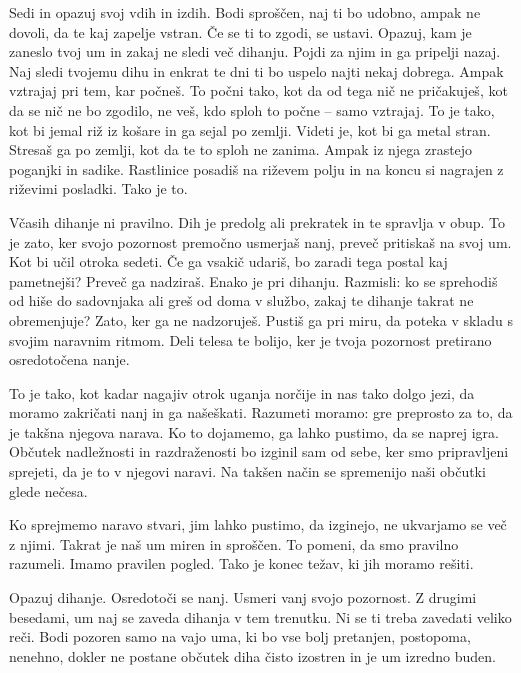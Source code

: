 Sedi in opazuj svoj vdih in izdih. Bodi sproščen, naj ti bo udobno, ampak ne dovoli, da te kaj zapelje vstran. Če se ti to zgodi, se ustavi. Opazuj, kam je zaneslo tvoj um in zakaj ne sledi več dihanju. Pojdi za njim in ga pripelji nazaj. Naj sledi tvojemu dihu in enkrat te dni ti bo uspelo najti nekaj dobrega. Ampak vztrajaj pri tem, kar počneš. To počni tako, kot da od tega nič ne pričakuješ, kot da se nič ne bo zgodilo, ne veš, kdo sploh to počne – samo vztrajaj. To je tako, kot bi jemal riž iz košare in ga sejal po zemlji. Videti je, kot bi ga metal stran. Stresaš ga po zemlji, kot da te to sploh ne zanima. Ampak iz njega zrastejo poganjki in sadike. Rastlinice posadiš na riževem polju in na koncu si nagrajen z riževimi posladki. Tako je to.

\clearpage

\enlargethispage{2\baselineskip}


Včasih dihanje ni pravilno. Dih je predolg ali prekratek in te spravlja v obup. To je zato, ker svojo pozornost premočno usmerjaš nanj, preveč pritiskaš na svoj um. Kot bi učil otroka sedeti. Če ga vsakič udariš, bo zaradi tega postal kaj pametnejši? Preveč ga nadziraš. Enako je pri dihanju. Razmisli: ko se sprehodiš od hiše do sadovnjaka ali greš od doma v službo, zakaj te dihanje takrat ne obremenjuje? Zato, ker ga ne nadzoruješ. Pustiš ga pri miru, da poteka v skladu s svojim naravnim ritmom. Deli telesa te bolijo, ker je tvoja pozornost pretirano osredotočena nanje.

\vspace{-2\baselineskip}

To je tako, kot kadar nagajiv otrok uganja norčije in nas tako dolgo jezi, da moramo zakričati nanj in ga našeškati. Razumeti moramo: gre preprosto za to, da je takšna njegova narava. Ko to dojamemo, ga lahko pustimo, da se naprej igra. Občutek nadležnosti in razdraženosti bo izginil sam od sebe, ker smo pripravljeni sprejeti, da je to v njegovi naravi. Na takšen način se spremenijo naši občutki glede nečesa.

Ko sprejmemo naravo stvari, jim lahko pustimo, da izginejo, ne ukvarjamo se več z njimi. Takrat je naš um miren in sproščen. To pomeni, da smo pravilno razumeli. Imamo pravilen pogled. Tako je konec težav, ki jih moramo rešiti.

\clearpage


Opazuj dihanje. Osredotoči se nanj. Usmeri vanj svojo pozornost. Z drugimi besedami, um naj se zaveda dihanja v tem trenutku. Ni se ti treba zavedati veliko reči. Bodi pozoren samo na vajo uma, ki bo vse bolj pretanjen, postopoma, nenehno, dokler ne postane občutek diha čisto izostren in je um izredno buden.

